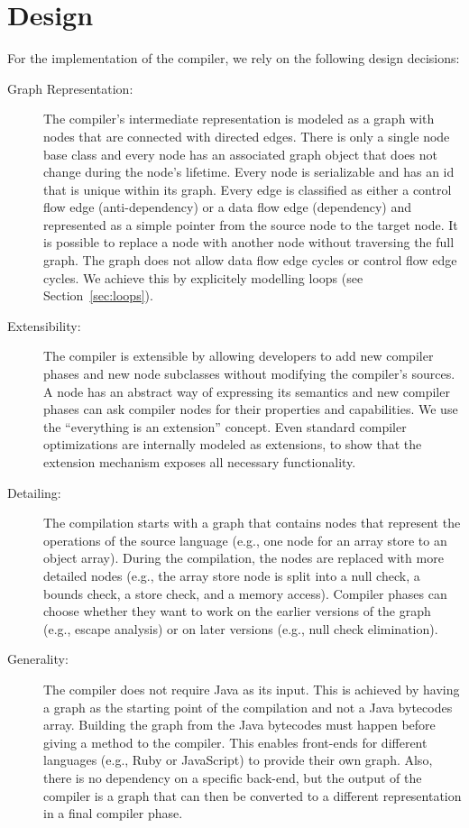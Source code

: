 \documentclass[twocolumn]{svjour3}
\begin{document}
\section{Design}
For the implementation of the compiler, we rely on the following design decisions:
\begin{description}
\item[Graph Representation:]
The compiler's intermediate representation is modeled as a graph with nodes that are connected with directed edges.
There is only a single node base class and every node has an associated graph object that does not change during the node's lifetime.
Every node is serializable and has an id that is unique within its graph.
Every edge is classified as either a control flow edge (anti-dependency) or a data flow edge (dependency) and represented as a simple pointer from the source node to the target node.
It is possible to replace a node with another node without traversing the full graph.
The graph does not allow data flow edge cycles or control flow edge cycles.
We achieve this by explicitely modelling loops (see Section~\ref{sec:loops}). 
\item[Extensibility:]
The compiler is extensible by allowing developers to add new compiler phases and new node subclasses without modifying the compiler's sources.
A node has an abstract way of expressing its semantics and new compiler phases can ask compiler nodes for their properties and capabilities.
We use the ``everything is an extension'' concept.
Even standard compiler optimizations are internally modeled as extensions, to show that the extension mechanism exposes all necessary functionality.
\item[Detailing:]
The compilation starts with a graph that contains nodes that represent the operations of the source language (e.g., one node for an array store to an object array).
During the compilation, the nodes are replaced with more detailed nodes (e.g., the array store node is split into a null check, a bounds check, a store check, and a memory access).
Compiler phases can choose whether they want to work on the earlier versions of the graph (e.g., escape analysis) or on later versions (e.g., null check elimination).
\item[Generality:]
The compiler does not require Java as its input.
This is achieved by having a graph as the starting point of the compilation and not a Java bytecodes array.
Building the graph from the Java bytecodes must happen before giving a method to the compiler.
This enables front-ends for different languages (e.g., Ruby or JavaScript) to provide their own graph.
Also, there is no dependency on a specific back-end, but the output of the compiler is a graph that can then be converted to a different representation in a final compiler phase.
\end{description}
\end{document}
